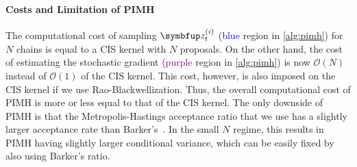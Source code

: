 \paragraph{Costs and Limitation of PIMH}
The computational cost of sampling \(\vz^{(i)}_{t}\) (\textcolor{blue}{blue} region in \cref{alg:pimh}) for \(N\) chains is equal to a CIS kernel with \(N\) proposals.
On the other hand, the cost of estimating the stochastic gradient (\textcolor{purple}{purple} region in \cref{alg:pimh}) is now \(\mathcal{O}(N)\) instead of \(\mathcal{O}(1)\) of the CIS kernel.
This cost, however, is also imposed on the CIS kernel if we use Rao-Blackwellization.
Thus, the overall computational cost of PIMH is more or less equal to that of the CIS kernel.
The only downside of PIMH is that the Metropolis-Hastings acceptance ratio that we use has a slightly larger acceptance rate than Barker's~\citep{peskun_optimum_1973, minh_understanding_2015}.
In the small \(N\) regime, this results in PIMH having slightly larger conditional variance, which can be easily fixed by also using Barker's ratio.

